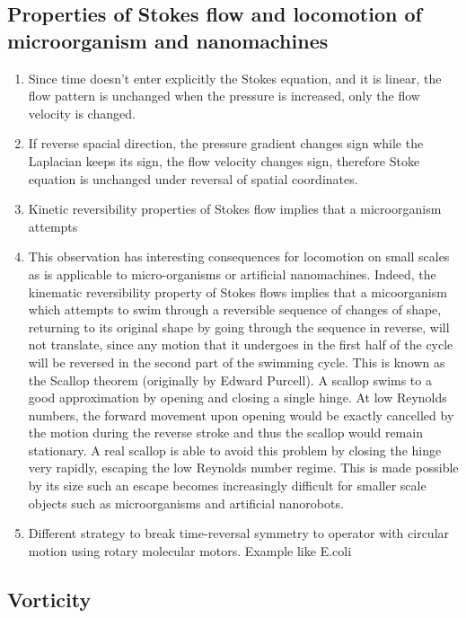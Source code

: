\documentclass[12pt,a4paper]{article}
\begin{document}
        \subsection{Properties of Stokes flow and locomotion of microorganism and nanomachines}
            \begin{enumerate}
                \item Since time doesn't enter explicitly the Stokes equation, and it is linear, the flow pattern is unchanged when the pressure is increased, only the flow velocity is changed.
                \item If reverse spacial direction, the pressure gradient changes sign while the Laplacian keeps its sign, the flow velocity changes sign, therefore Stoke equation is unchanged under reversal of spatial coordinates.
                \item Kinetic reversibility properties of Stokes flow implies that a microorganism attempts
                \item This observation has interesting consequences for locomotion on small scales as is applicable to micro-organisms or artificial nanomachines. 
                Indeed, the kinematic reversibility property of Stokes flows implies that a micoorganism which attempts to swim through a reversible sequence of changes of shape, returning to its original shape by going through the sequence in reverse, will not translate, since any motion that it undergoes in the first half of the cycle will be reversed in the second part of the swimming cycle. 
                This is known as the Scallop theorem (originally by Edward Purcell). 
                A scallop swims to a good approximation by opening and closing a single hinge. 
                At low Reynolds numbers, the forward movement upon opening would be exactly cancelled by the motion during the reverse stroke and thus the scallop would remain stationary. 
                A real scallop is able to avoid this problem by closing the hinge very rapidly, escaping the low Reynolds number regime. 
                This is made possible by its size such an escape becomes increasingly difficult for smaller scale objects such as microorganisms and artificial nanorobots.
                \item Different strategy to break time-reversal symmetry to operator with circular motion using rotary molecular motors. Example like E.coli
            \end{enumerate}
        \subsection{Vorticity}
\end{document}
